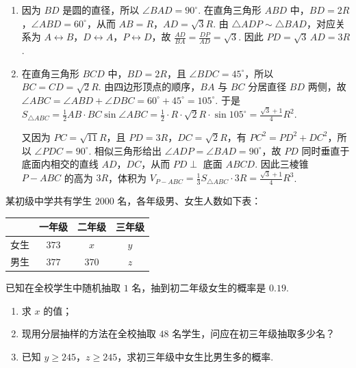 \begin{solution}
\begin{enumerate}
\item 因为 \(BD\) 是圆的直径，所以 \(\angle BAD=90^\circ\). 在直角三角形 \(ABD\) 中，\(BD=2R\)，\(\angle ABD=60^\circ\)，从而 \(AB=R\)，\(AD=\sqrt3R\). 由 \(\triangle ADP\sim\triangle BAD\)，对应关系为 \(A\leftrightarrow B\)，\(D\leftrightarrow A\)，\(P\leftrightarrow D\)，故
\(\frac{AD}{BA}=\frac{DP}{AD}=\sqrt3\). 因此 \(PD=\sqrt3\,AD=3R\).

\item 在直角三角形 \(BCD\) 中，\(BD=2R\)，且 \(\angle BDC=45^\circ\)，所以 \(BC=CD=\sqrt2R\). 由四边形顶点的顺序，\(BA\) 与 \(BC\) 分居直径 \(BD\) 两侧，故 \(\angle ABC=\angle ABD+\angle DBC=60^\circ+45^\circ=105^\circ\). 于是
\(S_{\triangle ABC}=\frac12AB\cdot BC\sin\angle ABC=\frac12\cdot R\cdot\sqrt2R\cdot\sin105^\circ=\frac{\sqrt3+1}{4}R^2\).

又因为 \(PC=\sqrt{11}R\)，且 \(PD=3R\)，\(DC=\sqrt2R\)，有 \(PC^2=PD^2+DC^2\)，所以 \(\angle PDC=90^\circ\). 相似三角形给出 \(\angle ADP=\angle BAD=90^\circ\)，故 \(PD\) 同时垂直于底面内相交的直线 \(AD\)，\(DC\)，从而 \(PD\perp\) 底面 \(ABCD\). 因此三棱锥 \(P-ABC\) 的高为 \(3R\)，体积为
\(V_{P-ABC}=\frac13S_{\triangle ABC}\cdot3R=\frac{\sqrt3+1}{4}R^3\).
\end{enumerate}
\end{solution}

\begin{problem}
某初级中学共有学生 \(2000\) 名，各年级男、女生人数如下表：

\begin{center}
\begin{tabular}{c|ccc}
\hline
 & 一年级 & 二年级 & 三年级 \\
\hline
女生 & \(373\) & \(x\) & \(y\) \\
男生 & \(377\) & \(370\) & \(z\) \\
\hline
\end{tabular}
\end{center}

已知在全校学生中随机抽取 \(1\) 名，抽到初二年级女生的概率是 \(0.19\).

\begin{enumerate}
\item 求 \(x\) 的值；
\item 现用分层抽样的方法在全校抽取 \(48\) 名学生，问应在初三年级抽取多少名？
\item 已知 \(y \geqslant 245\)，\(z \geqslant 245\)，求初三年级中女生比男生多的概率.
\end{enumerate}
\end{problem}

